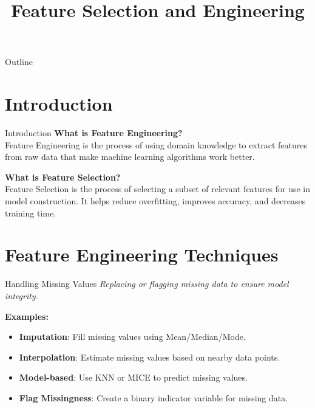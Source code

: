 \documentclass{beamer}
\title{Feature Selection and Engineering}
\subtitle{}
\date{}
\begin{document}
{
\begin{frame}
    \titlepage
\end{frame}
}

\begin{frame}{Outline}
    \tableofcontents
\end{frame}

\section{Introduction}

\begin{frame}{Introduction}
  \bigskip
  \textbf{What is Feature Engineering?}\\ 
  Feature Engineering is the process of using domain knowledge to extract features from raw data that make machine learning algorithms work better.
  \bigskip

  \textbf{What is Feature Selection?}\\  
  Feature Selection is the process of selecting a subset of relevant features for use in model construction. It helps reduce overfitting, improves accuracy, and decreases training time.
\end{frame}

\section{Feature Engineering Techniques}

\begin{frame}{Handling Missing Values}
  \textit{Replacing or flagging missing data to ensure model integrity.}  

  \textbf{Examples:}  
  \begin{itemize}
    \item \textbf{Imputation}: Fill missing values using Mean/Median/Mode.
    \item \textbf{Interpolation}: Estimate missing values based on nearby data points.
    \item \textbf{Model-based}: Use KNN or MICE to predict missing values.
    \item \textbf{Flag Missingness}: Create a binary indicator variable for missing data.
  \end{itemize}
\end{frame}
\end{document}
